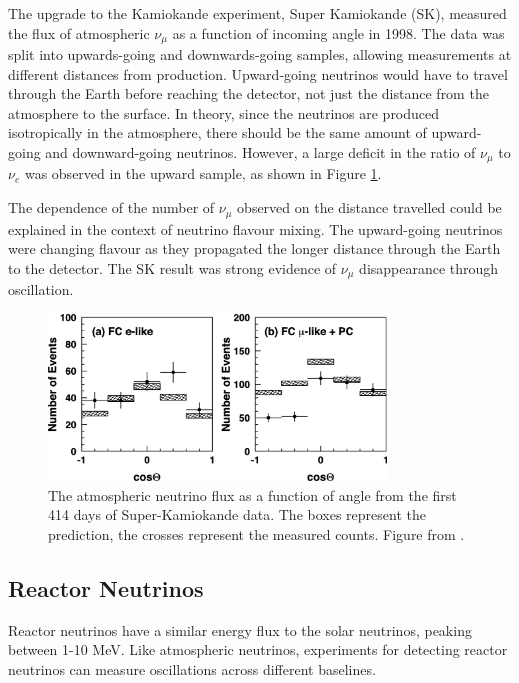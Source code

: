 The upgrade to the Kamiokande experiment, Super Kamiokande (SK), measured the flux of atmospheric $\nu_{\mu}$ as a function of incoming angle in 1998. The data was split into upwards-going and downwards-going samples, allowing measurements at different distances from production. Upward-going neutrinos would have to travel through the Earth before reaching the detector, not just the distance from the atmosphere to the surface. In theory, since the neutrinos are produced isotropically in the atmosphere, there should be the same amount of upward-going and downward-going neutrinos. However, a large deficit in the ratio of $\nu_{\mu}$ to $\nu_e$ was observed in the upward sample, as shown in Figure \ref{atmosflux}.

The dependence of the number of $\nu_{\mu}$ observed on the distance travelled could be explained in the context of neutrino flavour mixing. The upward-going neutrinos were changing flavour as they propagated the longer distance through the Earth to the detector. The SK result was strong evidence of $\nu_{\mu}$ disappearance through oscillation.

\begin{figure}[!htbp]
\vspace{20pt}
\centering
\includegraphics*[width=0.8\textwidth,clip]{figs/atmosfluxsk.png}
\caption{The atmospheric neutrino flux as a function of angle from the first 414 days of Super-Kamiokande data. The boxes represent the prediction, the crosses represent the measured counts. Figure from \cite{skfluxatmos}.} \label{atmosflux}
\end{figure}

\subsection{Reactor Neutrinos}\label{sec:reactorneutrinos}

Reactor neutrinos have a similar energy flux to the solar neutrinos, peaking between 1-10 MeV. Like atmospheric neutrinos, experiments for detecting reactor neutrinos can measure oscillations across different baselines.


